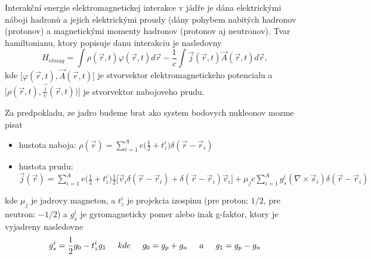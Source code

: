 \documentclass[../../main.tex]{subfiles}
\begin{document}
Interakční energie elektromagnetickej interakce v jádře je dána elektrickými náboji hadronů a jejich elektrickými proudy (dány pohybem nabitých hadronov (protonov) a magnetickými momenty hadronov (protonov aj neutronov). Tvar hamiltonianu, ktory popisuje danu interakciu je nasledovny
\begin{equation}
H_{elmag}=\int\rho(\vec{r},t)\varphi(\vec{r},t)d\vec{r}-\frac{1}{c}\int\vec{j}(\vec{r},t)\vec{A}(\vec{r},t)d\vec{r},
\end{equation}
kde $\big[ \varphi(\vec{r},t),\vec{A}(\vec{r},t) \big]$ je stvorvektor elektromagnetickeho potencialu a $\big[\rho(\vec{r},t),\frac{\vec{j}}{c}(\vec{r},t)) \big]$ je stvorvektor nabojoveho prudu.\par
Za predpokladu, ze jadro budeme brat ako system bodovych nukleonov mozme pisat 
\begin{itemize}
	\item hustota naboja: $\rho(\vec{r})=\sum_{i=1}^Ae\big( \frac{1}{2}+t_z^i \big)\delta(\vec{r}-\vec{r}_{i})$
	\item hustota prudu: $\vec{j}(\vec{r})=\sum_{i=1}^Ae\big( \frac{1}{2}+t_z^i \big) \frac{1}{2}\big[\vec{v}_i \delta(\vec{r}-\vec{r}_i) + \delta(\vec{r}-\vec{r}_i)\vec{v}_i \big] + \mu_jc\sum_{i=1}^Ag_s^i(\nabla \times \vec{s}_i) \delta(\vec{r}-\vec{r}_i)  $
\end{itemize}
kde $\mu_j$ je jadrovy magneton, a $t_z^i$ je projekcia izospinu (pre proton: $1/2$, pre neutron: $-1/2$) a $g_s^i$ je gyromagneticky pomer alebo inak g-faktor, ktory je vyjadreny nasledovne
$$ g_s^i = \frac{1}{2}g_0-t_z^ig_1 \hspace{0.5cm} kde \hspace{0.5cm} g_0=g_p+g_n \hspace{0.5cm} a \hspace{0.5cm} g_1=g_p-g_n $$
\end{document}
